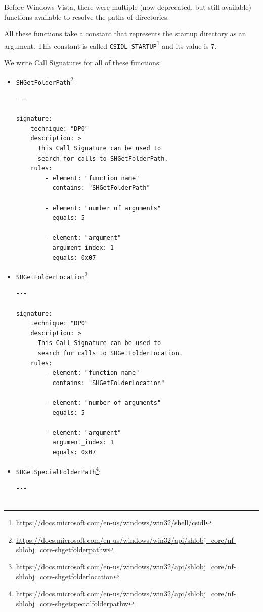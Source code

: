Before Windows Vista, there were multiple (now deprecated, but still available) functions available to resolve the paths of directories.

All these functions take a constant that represents the startup directory as an argument. This constant is called \texttt{CSIDL\_STARTUP}\footnote{\tiny \url{https://docs.microsoft.com/en-us/windows/win32/shell/csidl}} and its value is 7.

\pagebreak

We write Call Signatures for all of these functions:
\begin{itemize}
    \item \texttt{SHGetFolderPath}\footnote{\tiny \url{https://docs.microsoft.com/en-us/windows/win32/api/shlobj_core/nf-shlobj_core-shgetfolderpathw}}
\begin{lstlisting}[caption={A Call Signature that matches a call to \texttt{SHGetFolderPath}.}, captionpos=b]
---

signature:
    technique: "DP0"
    description: >
      This Call Signature can be used to
      search for calls to SHGetFolderPath.
    rules:
        - element: "function name"
          contains: "SHGetFolderPath"

        - element: "number of arguments"
          equals: 5

        - element: "argument"
          argument_index: 1
          equals: 0x07
\end{lstlisting}


    \item \texttt{SHGetFolderLocation}\footnote{\tiny \url{https://docs.microsoft.com/en-us/windows/win32/api/shlobj_core/nf-shlobj_core-shgetfolderlocation}}
\begin{lstlisting}[caption={A Call Signature that matches a call to \texttt{SHGetFolderLocation}.}, captionpos=b]
---

signature:
    technique: "DP0"
    description: >
      This Call Signature can be used to
      search for calls to SHGetFolderLocation.
    rules:
        - element: "function name"
          contains: "SHGetFolderLocation"

        - element: "number of arguments"
          equals: 5

        - element: "argument"
          argument_index: 1
          equals: 0x07
\end{lstlisting}

\pagebreak

    \item \texttt{SHGetSpecialFolderPath}\footnote{\tiny \url{https://docs.microsoft.com/en-us/windows/win32/api/shlobj_core/nf-shlobj_core-shgetspecialfolderpathw}}:
\begin{lstlisting}[caption={A Call Signature that matches a call to \texttt{SHGetSpecialFolderPath}.}, captionpos=b]
---


\end{lstlisting}
\end{itemize}
